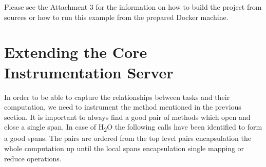 Please see the Attachment 3 for the information on how to build the project from sources or how to run this example from the prepared Docker machine. 

\section{Extending the Core Instrumentation Server}
In order to be able to capture the relationships between tasks and their computation, we need to instrument the method mentioned in the previous section. It is important to always find a good pair of methods which open and close a single span. In case of H\textsubscript{2}O the following calls have been identified to form a good spans. The pairs are ordered from the top level pairs encapsulation the whole computation up until the local spans encapsulation single mapping or reduce operations.

